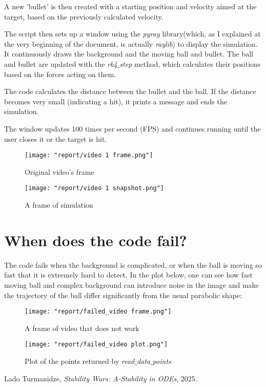 \documentclass{article}
\begin{document}
	A new 'bullet' is then created with a starting position and velocity aimed at the target, based on the previously calculated velocity.
	
	The script then sets up a window using the \textit{pyray} library(which, as I explained at the very beginning of the document, is actually \textit{raylib}) to display the simulation. It continuously draws the background and the moving ball and bullet. The ball and bullet are updated with the \textit{rk4$\_$step} method, which calculates their positions based on the forces acting on them.
	
	The code calculates the distance between the bullet and the ball. If the distance becomes very small (indicating a hit), it prints a message and ends the simulation.
	
	The window updates 100 times per second (FPS) and continues running until the user closes it or the target is hit.
	
	\begin{figure}[H]
		\centering
		\begin{minipage}{0.5\textwidth}
			\centering
			\texttt{[image: "report/video 1 frame.png"]}
			\caption{Original video's frame}
		\end{minipage}%
		\begin{minipage}{0.5\textwidth}
			\centering
			\texttt{[image: "report/video 1 snapshot.png"]}
			\caption{A frame of simulation}
		\end{minipage}
	\end{figure}
	
	\section*{When does the code fail?}
	
	The code fails when the background is complicated, or when the ball is moving so fast that it is extremely hard to detect. In the plot below, one can see how fast moving ball and complex background can introduce noise in the image and make the trajectory of the ball differ significantly from the usual parabolic shape:
	
	\begin{figure}[H]
		\centering
		\begin{minipage}{0.5\textwidth}
			\centering
			\texttt{[image: "report/failed\_video frame.png"]}
			\caption{A frame of video that does not work}
		\end{minipage}%
		\begin{minipage}{0.5\textwidth}
			\centering
			\texttt{[image: "report/failed\_video plot.png"]}
			\caption{Plot of the points returned by \textit{read$\_$data$\_$points}}
		\end{minipage}
	\end{figure}
	

	\begin{thebibliography}{1}	
		Lado Turmanidze,
		\textit{Stability Wars: A-Stability in ODEs},
		2025.
	\end{thebibliography}
\end{document}
